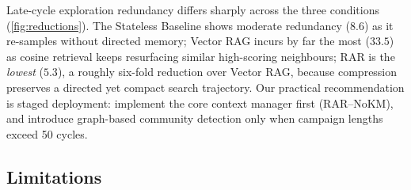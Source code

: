 \documentclass[conference]{IEEEtran}
\begin{document}
Late-cycle exploration redundancy differs sharply across the three conditions (\cref{fig:reductions}). The Stateless Baseline shows moderate redundancy ($8.6$) as it re-samples without directed memory; Vector RAG incurs by far the most ($33.5$) as cosine retrieval keeps resurfacing similar high-scoring neighbours; RAR is the \emph{lowest} ($5.3$), a roughly six-fold reduction over Vector RAG, because compression preserves a directed yet compact search trajectory. Our practical recommendation is staged deployment: implement the core context manager first (RAR--NoKM), and introduce graph-based community detection only when campaign lengths exceed 50 cycles.

\subsection{Limitations}
\label{sec:limitations}
\end{document}
